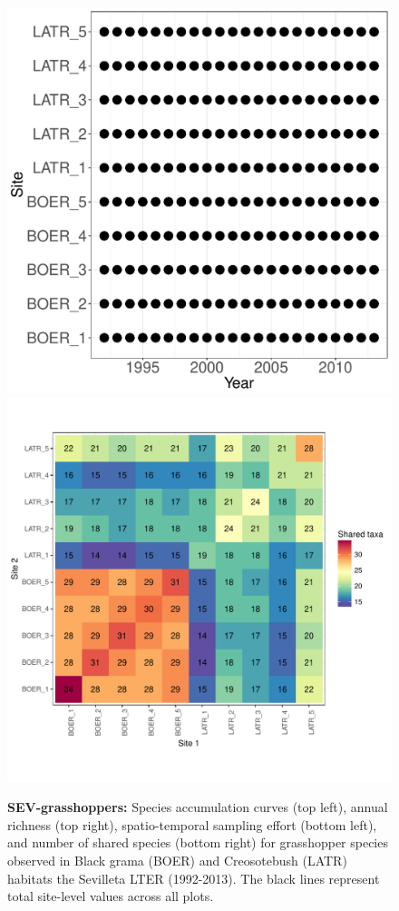 \documentclass[11pt, oneside]{article}
\begin{document}
\begin{figure}[h!]
\includegraphics[scale = 0.4]{sev-grasshopper-compagnoni_spatiotemporal_sampling_effort.pdf}
\includegraphics[scale = 0.4]{sev-grasshopper-compagnoni_spp_shared.pdf}
\caption{{\bf SEV-grasshoppers:} Species accumulation curves (top left),  annual richness (top right), spatio-temporal sampling effort (bottom left), and number of shared species (bottom right) for grasshopper species observed in Black grama (BOER) and Creosotebush (LATR) habitats the Sevilleta LTER (1992-2013). The black lines represent total site-level values across all plots.}
\label{sev-grasshoppers}
\end{figure}
\end{document}
